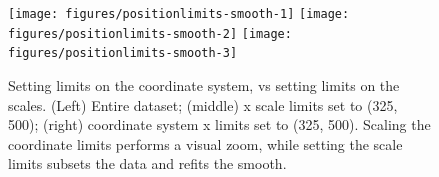 \begin{Shaded}
\begin{Highlighting}[]
\StringTok{ }\StringTok{ }\NormalTok{())}
\StringTok{ }\NormalTok{(} \NormalTok{(}\NormalTok{, }\NormalTok{))}
\StringTok{ }\NormalTok{(} \NormalTok{(}\NormalTok{, }\NormalTok{))}
\end{Highlighting}
\end{Shaded}

\begin{figure}

{\centering \texttt{[image: figures/positionlimits-smooth-1]} \texttt{[image: figures/positionlimits-smooth-2]} \texttt{[image: figures/positionlimits-smooth-3]} 

}

\caption{Setting limits on the coordinate system, vs setting limits on the scales.  (Left) Entire dataset; (middle) x scale limits set to (325, 500); (right) coordinate system x limits set to (325, 500).  Scaling the coordinate limits performs a visual zoom, while setting the scale limits subsets the data and refits the smooth.\label{fig:limits-smooth}}
\end{figure}

\begin{Shaded}
\begin{Highlighting}[]
\StringTok{ }\StringTok{ }
\StringTok{  }\NormalTok{(} \NormalTok{, }\NormalTok{) +}\StringTok{ }
\StringTok{  }\NormalTok{(} \NormalTok{)) }
\StringTok{ }\NormalTok{(} \NormalTok{(}\NormalTok{, }\NormalTok{))}
\StringTok{ }\NormalTok{(} \NormalTok{(}\NormalTok{, }\NormalTok{))}
\end{Highlighting}
\end{Shaded}

